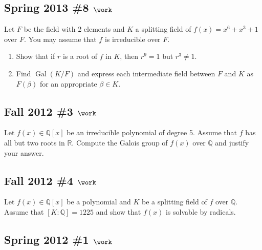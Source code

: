 \hypertarget{spring-2013-8-work}{%
\subsection{\texorpdfstring{Spring 2013 \#8
\(\work\)}{Spring 2013 \#8 \textbackslash work}}\label{spring-2013-8-work}}

Let \(F\) be the field with 2 elements and \(K\) a splitting field of
\(f(x) = x^6 + x^3 + 1\) over \(F\). You may assume that \(f\) is
irreducible over \(F\).

\begin{enumerate}
\def\labelenumi{\alph{enumi}.}
\item
  Show that if \(r\) is a root of \(f\) in \(K\), then \(r^9 = 1\) but
  \(r^3\neq 1\).
\item
  Find \(\operatorname{Gal}(K/F)\) and express each intermediate field
  between \(F\) and \(K\) as \(F(\beta)\) for an appropriate
  \(\beta \in K\).
\end{enumerate}

\hypertarget{fall-2012-3-work}{%
\subsection{\texorpdfstring{Fall 2012 \#3
\(\work\)}{Fall 2012 \#3 \textbackslash work}}\label{fall-2012-3-work}}

Let \(f(x) \in {\mathbb{Q}}[x]\) be an irreducible polynomial of degree
5. Assume that \(f\) has all but two roots in \({\mathbb{R}}\). Compute
the Galois group of \(f(x)\) over \({\mathbb{Q}}\) and justify your
answer.

\hypertarget{fall-2012-4-work}{%
\subsection{\texorpdfstring{Fall 2012 \#4
\(\work\)}{Fall 2012 \#4 \textbackslash work}}\label{fall-2012-4-work}}

Let \(f(x) \in {\mathbb{Q}}[x]\) be a polynomial and \(K\) be a
splitting field of \(f\) over \({\mathbb{Q}}\). Assume that
\([K:{\mathbb{Q}}] = 1225\) and show that \(f(x)\) is solvable by
radicals.

\hypertarget{spring-2012-1-work}{%
\subsection{\texorpdfstring{Spring 2012 \#1
\(\work\)}{Spring 2012 \#1 \textbackslash work}}\label{spring-2012-1-work}}

